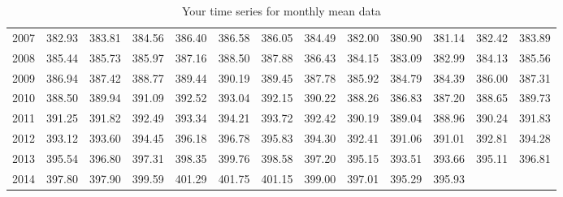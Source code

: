 \documentclass[11pt, a4paper]{article} %
\begin{document}
\begin{table}[ht]
{\begin{tabular}{rrrrrrrrrrrrr}
  2007 & 382.93 & 383.81 & 384.56 & 386.40 & 386.58 & 386.05 & 384.49 & 382.00 & 380.90 & 381.14 & 382.42 & 383.89 \\ 
  2008 & 385.44 & 385.73 & 385.97 & 387.16 & 388.50 & 387.88 & 386.43 & 384.15 & 383.09 & 382.99 & 384.13 & 385.56 \\ 
  2009 & 386.94 & 387.42 & 388.77 & 389.44 & 390.19 & 389.45 & 387.78 & 385.92 & 384.79 & 384.39 & 386.00 & 387.31 \\ 
  2010 & 388.50 & 389.94 & 391.09 & 392.52 & 393.04 & 392.15 & 390.22 & 388.26 & 386.83 & 387.20 & 388.65 & 389.73 \\ 
  2011 & 391.25 & 391.82 & 392.49 & 393.34 & 394.21 & 393.72 & 392.42 & 390.19 & 389.04 & 388.96 & 390.24 & 391.83 \\ 
  2012 & 393.12 & 393.60 & 394.45 & 396.18 & 396.78 & 395.83 & 394.30 & 392.41 & 391.06 & 391.01 & 392.81 & 394.28 \\ 
  2013 & 395.54 & 396.80 & 397.31 & 398.35 & 399.76 & 398.58 & 397.20 & 395.15 & 393.51 & 393.66 & 395.11 & 396.81 \\ 
  2014 & 397.80 & 397.90 & 399.59 & 401.29 & 401.75 & 401.15 & 399.00 & 397.01 & 395.29 & 395.93 &  &  \\ 
   \hline
\end{tabular}
}
\caption{Your time series for monthly mean data} 
\label{yourts}
\end{table}
\end{document}
